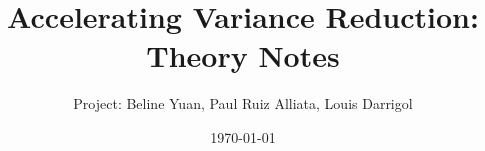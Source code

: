 \documentclass[11pt]{article}
\title{Accelerating Variance Reduction: Theory Notes}
\author{Project: Beline Yuan, Paul Ruiz Alliata, Louis Darrigol}
\date{\today}
\begin{document}
\maketitle
\tableofcontents
\renewcommand{\thesection}{B3}
\clearpage
\renewcommand{\thesection}{B2}
\clearpage
\renewcommand{\thesection}{B1}
\clearpage
\renewcommand{\thesection}{A1}
\clearpage
\renewcommand{\thesection}{A3}
\clearpage
\renewcommand{\thesection}{B4}
\clearpage


\end{document}

